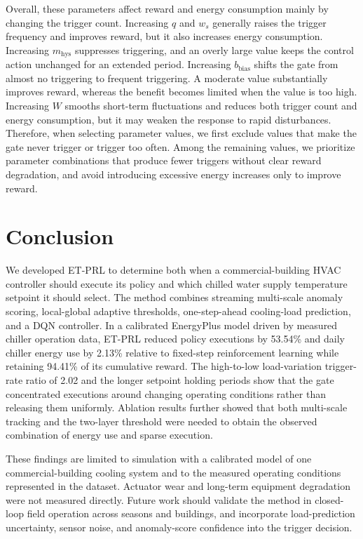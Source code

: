 \documentclass[preprint,12pt]{elsarticle}
\begin{document}
Overall, these parameters affect reward and energy consumption mainly by changing the trigger count. Increasing \(q\) and \(w_s\) generally raises the trigger frequency and improves reward, but it also increases energy consumption. Increasing \(m_{\mathrm{hys}}\) suppresses triggering, and an overly large value keeps the control action unchanged for an extended period. Increasing \(b_{\mathrm{bias}}\) shifts the gate from almost no triggering to frequent triggering. A moderate value substantially improves reward, whereas the benefit becomes limited when the value is too high. Increasing \(W\) smooths short-term fluctuations and reduces both trigger count and energy consumption, but it may weaken the response to rapid disturbances. Therefore, when selecting parameter values, we first exclude values that make the gate never trigger or trigger too often. Among the remaining values, we prioritize parameter combinations that produce fewer triggers without clear reward degradation, and avoid introducing excessive energy increases only to improve reward.

\section{Conclusion}\label{conclusion}

We developed ET-PRL to determine both when a commercial-building HVAC controller should execute its policy and which chilled water supply temperature setpoint it should select. The method combines streaming multi-scale anomaly scoring, local-global adaptive thresholds, one-step-ahead cooling-load prediction, and a DQN controller. In a calibrated EnergyPlus model driven by measured chiller operation data, ET-PRL reduced policy executions by 53.54\% and daily chiller energy use by 2.13\% relative to fixed-step reinforcement learning while retaining 94.41\% of its cumulative reward. The high-to-low load-variation trigger-rate ratio of 2.02 and the longer setpoint holding periods show that the gate concentrated executions around changing operating conditions rather than releasing them uniformly. Ablation results further showed that both multi-scale tracking and the two-layer threshold were needed to obtain the observed combination of energy use and sparse execution.

These findings are limited to simulation with a calibrated model of one commercial-building cooling system and to the measured operating conditions represented in the dataset. Actuator wear and long-term equipment degradation were not measured directly. Future work should validate the method in closed-loop field operation across seasons and buildings, and incorporate load-prediction uncertainty, sensor noise, and anomaly-score confidence into the trigger decision.
\end{document}
